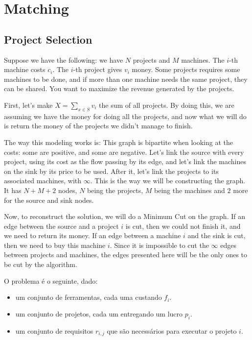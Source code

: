 
    \section{Matching}
        \subsection{Project Selection}
        Suppose we have the following: we have $N$ projects and $M$ machines. The $i$-th machine costs $c_i$. The $i$-th project gives $v_i$ money. Some projects requires some machines to be done, and if more than one machine needs the same project, they can be shared. You want to maximize the revenue generated by the projects.

        First, let's make $X = \sum_{x \in S} v_i$ the sum of all projects. By doing this, we are assuming we have the money for doing all the projects, and now what we will do is return the money of the projects we didn't manage to finish.

        The way this modeling works is: This graph is bipartite when looking at the costs: some are positive, and some are negative. Let's link the source with every project, using its cost as the flow passing by its edge, and let's link the machines on the sink by its price to be used. After it, let's link the projects to its associated machines, with $\infty$. This is the way we will be constructing the graph. It has $N+M+2$ nodes, $N$ being the projects, $M$ being the machines and $2$ more for the source and sink nodes.

        Now, to reconstruct the solution, we will do a Minimum Cut on the graph. If an edge between the source and a project $i$ is cut, then we could not finish it, and we need to return its money. If an edge between a machine $i$ and the sink is cut, then we need to buy this machine $i$. Since it is impossible to cut the $\infty$ edges between projects and machines, the edges presented here will be the only ones to be cut by the algorithm.
        
        O problema é o seguinte, dado:
            \begin{itemize}
                \item um conjunto de ferramentas, cada uma custando $f_i$.
                \item um conjunto de projetos, cada um entregando um lucro $p_i$.
                \item um conjunto de requisitos $r_{i,j}$ que são necessários para executar o projeto $i$.
            \end{itemize}


